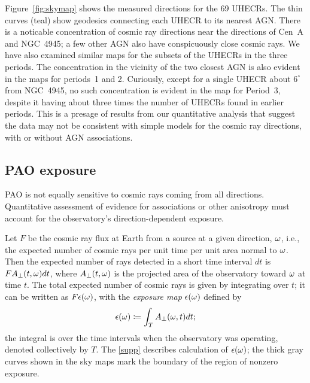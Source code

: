 Figure~\ref{fig:skymap} shows the measured directions for the 69 UHECRs.
The thin curves (teal) show
geodesics connecting each UHECR to its nearest AGN.
There is a noticable concentration of cosmic ray directions near the
directions of Cen~A and NGC~4945; a few other AGN also have conspicuously
close cosmic rays.  We have also examined similar maps for the subsets
of the UHECRs in the three periods.
The concentration in the vicinity of the two closest AGN
is also evident in the maps for periods~1 and 2.
Curiously, except for a single UHECR about $6^\circ$
from NGC~4945, no such concentration is evident in the map for Period~3,
despite it having about three times the number of UHECRs found in earlier
periods.  This is a presage of results from our quantitative analysis that
suggest the data may not be consistent with simple models for the cosmic ray
directions, with or without AGN associations.

\subsection{PAO exposure}
\label{sec:expo}

PAO is not equally sensitive to cosmic rays coming from all directions.
Quantitative assessment of evidence for associations or other anisotropy must
account for the observatory's direction-dependent exposure.

Let $F$ be the cosmic ray flux at Earth from a source at a given direction,
$\omega$, i.e., the expected number of cosmic rays per unit time per unit
area normal to $\omega$.   Then the expected number of rays detected in a
short time interval $dt$ is $F A_\perp(t,\omega) dt$, where $A_\perp(t,\omega)$ is
the projected area of the observatory toward $\omega$ at time $t$. The total
expected number of cosmic rays is given by integrating over $t$; it can be
written as $F\epsilon(\omega)$, with the {\em exposure map} $\epsilon(\omega)$
defined by
\begin{equation}
\expo(\tdrxn) \coloneqq \int_T  \Aperp(\tdrxn,t) dt;
\label{expo-def-main}
\end{equation}
the integral is over the time intervals when the observatory was operating,
denoted collectively by $T$.
The \ref{supp} \cite{S+12-UHECR-Supp} describes calculation of
$\epsilon(\omega)$; the thick gray curves shown in the sky maps mark the
boundary of the region of nonzero exposure.
